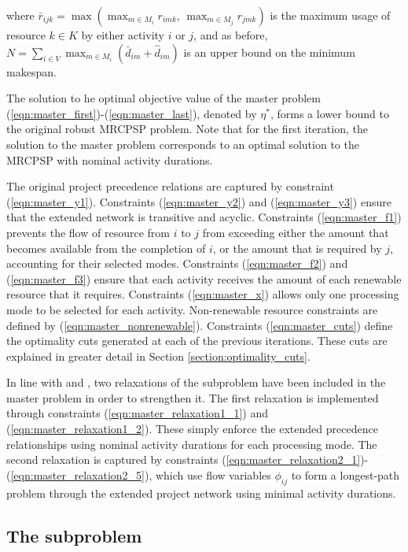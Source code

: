 \documentclass[a4paper,abstracton]{scrartcl}
\begin{document}
where $\bar{r}_{ijk}=\max(\max_{m\in M_i}r_{imk},\,\max_{m\in M_j}r_{jmk})$ is the maximum usage of resource $k\in K$ by either activity $i$ or $j$, and as before, $N=\sum_{i\in V}\max_{m\in M_i}(\bar{d}_{im}+\hat{d}_{im})$ is an upper bound on the minimum makespan.

The solution to he optimal objective value of the master problem (\ref{eqn:master_first})-(\ref{eqn:master_last}), denoted by $\eta^*$, forms a lower bound to the original robust MRCPSP problem. Note that for the first iteration, the solution to the master problem corresponds to an optimal solution to the MRCPSP with nominal activity durations. 

The original project precedence relations are captured by constraint (\ref{eqn:master_y1}). Constraints (\ref{eqn:master_y2}) and (\ref{eqn:master_y3}) ensure that the extended network is transitive and acyclic. Constraints (\ref{eqn:master_f1}) prevents the flow of resource from $i$ to $j$ from exceeding either the amount that becomes available from the completion of $i$, or the amount that is required by $j$, accounting for their selected modes. Constraints (\ref{eqn:master_f2}) and (\ref{eqn:master_f3}) ensure that each activity receives the amount of each renewable resource that it requires. Constraints (\ref{eqn:master_x}) allows only one processing mode to be selected for each activity. Non-renewable resource constraints are defined by (\ref{eqn:master_nonrenewable}). Constraints (\ref{eqn:master_cuts}) define the optimality cuts generated at each of the previous iterations. These cuts are explained in greater detail in Section \ref{section:optimality_cuts}.

In line with \cite{bruni2017adjustable} and \cite{balouka2021robust}, two relaxations of the subproblem have been included in the master problem in order to strengthen it. The first relaxation is implemented through constraints (\ref{eqn:master_relaxation1_1}) and (\ref{eqn:master_relaxation1_2}). These simply enforce the extended precedence relationships using nominal activity durations for each processing mode. The second relaxation is captured by constraints (\ref{eqn:master_relaxation2_1})-(\ref{eqn:master_relaxation2_5}), which use flow variables $\phi_{ij}$ to form a longest-path problem through the extended project network using minimal activity durations.

\subsection{The subproblem}
 
\end{document}
